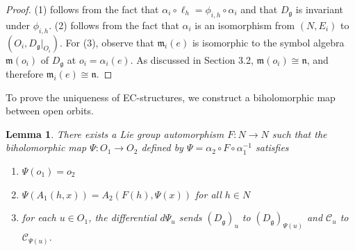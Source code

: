 \documentclass{amsart}
\newtheorem{lemma}[theorem]{Lemma}
\theoremstyle{definition}
\theoremstyle{remark}
\newcommand{\g}{\mathfrak{g}}
\newcommand{\m}{\mathfrak{m}}
\newcommand{\n}{\mathfrak{n}}
\begin{document}
\begin{proof}
(1) follows from the fact that $\alpha_i \circ \ell_h = \phi_{i, h} \circ \alpha_i$ and that $D_\g$ is invariant under $\phi_{i, h}$. (2) follows from the fact that $\alpha_i$ is an isomorphism from $(N, E_i)$ to $(O_i, D_\g|_{O_i})$. For (3), observe that $\m_i(e)$ is isomorphic to the symbol algebra $\m(o_i)$ of $D_\g$ at $o_i = \alpha_i(e)$. As discussed in Section 3.2, $\m(o_i) \cong \n$, and therefore $\m_i(e) \cong \n$.
\end{proof}

To prove the uniqueness of EC-structures, we construct a biholomorphic map between open orbits.


\begin{lemma}
\label{local isomorphism}
There exists a Lie group automorphism \(F: N \to N\) such that the biholomorphic map $\Psi: O_1 \to O_2$ defined by $\Psi = \alpha_2 \circ F \circ \alpha_1^{-1}$ satisfies 
\begin{enumerate}[label=(\arabic*)]
    \item \(\Psi(o_1) = o_2\)
    \item \(\Psi(A_1(h, x)) = A_2(F(h), \Psi(x))\) for all \(h \in N\)
    \item for each \(u \in O_1\), the differential \(d\Psi_u\) sends \((D_\g)_u\) to \((D_\g)_{\Psi(u)}\) and \(\mathscr{C}_u\) to \(\mathscr{C}_{\Psi(u)}\). 
\end{enumerate}
\end{lemma}
\end{document}
